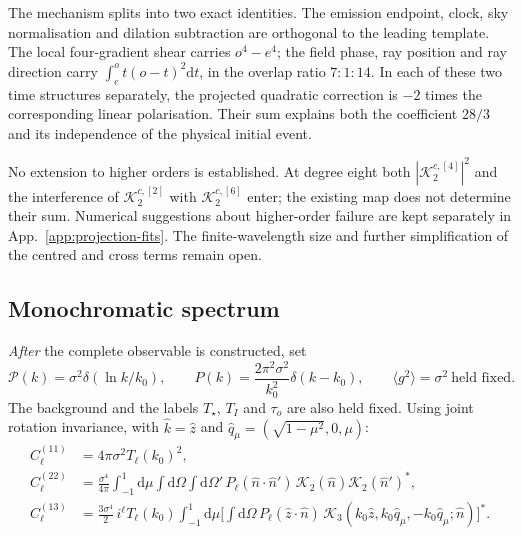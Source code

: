 \documentclass[11pt]{article}
\theoremstyle{definition}
\theoremstyle{remark}
\newcommand{\nh}{\hat n}
\newcommand{\dd}{\mathrm{d}}
\newcommand{\ens}[1]{\langle #1\rangle}
\begin{document}
\begin{itemize}
  The mechanism splits into two exact identities. The emission endpoint, clock, sky
  normalisation and dilation subtraction are orthogonal to the leading template.
  The local four-gradient shear carries $o^4-e^4$; the field phase, ray position and
  ray direction carry $\int_e^ot(o-t)^2\dd t$, in the overlap ratio $7:1:14$.
  In each of these two time structures separately, the projected quadratic correction
  is $-2$ times the corresponding linear polarisation. Their sum explains both the
  coefficient $28/3$ and its independence of the physical initial event.

  No extension to higher orders is established. At degree eight both
  $|\mathcal K_2^{c,[4]}|^2$ and the interference of $\mathcal K_2^{c,[2]}$ with
  $\mathcal K_2^{c,[6]}$ enter; the existing map does not determine their sum.
  Numerical suggestions about higher-order failure are kept separately in
  App.~\ref{app:projection-fits}. The finite-wavelength size and further simplification
  of the centred and cross terms remain open.
\end{itemize}

\subsection{Monochromatic spectrum}\label{sec:mono}

\emph{After} the complete observable is constructed, set
\[
\mathcal P(k)=\sigma^2\delta(\ln k/k_0),\qquad P(k)=\frac{2\pi^2\sigma^2}{k_0^2}\delta(k-k_0),
\qquad\ens{g^2}=\sigma^2\ \text{held fixed}.
\]
The background and the labels $T_\star$, $T_I$ and $\tau_o$ are also held fixed. Using joint
rotation invariance, with $\hat k=\hat z$ and $\hat q_\mu=(\sqrt{1-\mu^2},0,\mu)$:
\begin{align}
C^{(11)}_\ell&=4\pi\sigma^2T_\ell(k_0)^2,\\
C^{(22)}_\ell&=\frac{\sigma^4}{4\pi}\int_{-1}^1\!\dd\mu\!\int\!\dd\Omega\!\int\!\dd\Omega'\,P_\ell(\nh\cdot\nh')\,\mathcal K_2(\nh)\mathcal K_2(\nh')^*,\\
C^{(13)}_\ell&=\frac{3\sigma^4}{2}\,i^\ell T_\ell(k_0)\int_{-1}^1\!\dd\mu\Big[\int\!\dd\Omega\,P_\ell(\hat z\cdot\nh)\,\mathcal K_3(k_0\hat z,k_0\hat q_\mu,-k_0\hat q_\mu;\nh)\Big]^* .
\end{align}
\end{document}
